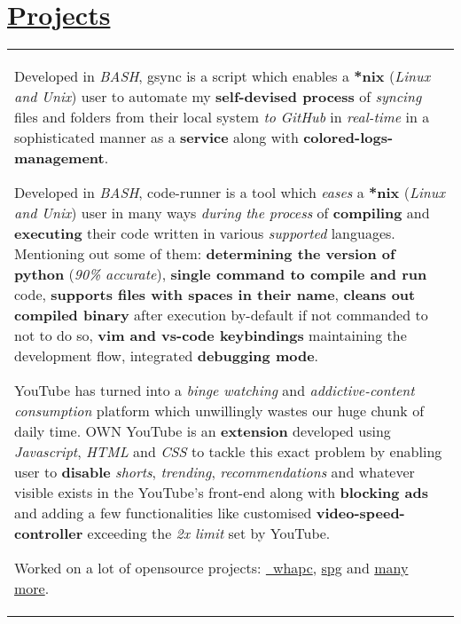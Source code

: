 \documentclass[a4paper,10pt]{extarticle} %
\begin{document}
\section{\textcolor{primary}{\href{https://www.github.com/proffapt}{Projects}}}
 \vspace{-0.5cm}
\begin{tabular}{p{19.7cm}}
\begin{description}[style=nextline, font=$\bullet$\hspace{2mm}\normalsize]
 
 \item[{\href{https://github.com/proffapt/gsyc}{GSYNC}}] 
 Developed in \textit{BASH}, gsync is a script which enables a \textbf{*nix} (\textit{Linux and Unix}) user to automate my \textbf{self-devised process} of \textit{syncing} files and folders from their local system \textit{to GitHub} in \textit{real-time} in a sophisticated manner as a \textbf{service} along with \textbf{colored-logs-management}.
 
 \item[{\href{https://github.com/proffapt/code-runner}{Code\_Runner}}] 
Developed in \textit{BASH}, code-runner is a tool which \textit{eases} a \textbf{*nix} (\textit{Linux and Unix}) user in many ways \textit{during the process} of \textbf{compiling} and \textbf{executing} their code written in various \textit{supported} languages. Mentioning out some of them: \textbf{determining the version of python} (\textit{90\% accurate}), \textbf{single command to compile and run} code, \textbf{supports files with spaces in their name}, \textbf{cleans out compiled binary} after execution by-default if not commanded to not to do so, \textbf{vim and vs-code keybindings} maintaining the development flow, integrated \textbf{debugging mode}.
 
 \item[{\href{https://github.com/proffapt/own-youtube}{OWN YouTube}}] 
 YouTube has turned into a \textit{binge watching} and \textit{addictive-content consumption} platform which unwillingly wastes our huge chunk of daily time. OWN YouTube is an \textbf{extension} developed using \textit{Javascript}, \textit{HTML} and \textit{CSS} to tackle this exact problem by enabling user to \textbf{disable} \textit{shorts}, \textit{trending}, \textit{recommendations} and whatever visible exists in the YouTube's front-end along with \textbf{blocking ads} and adding a few functionalities like customised \textbf{video-speed-controller} exceeding the \textit{2x limit} set by YouTube.
 
  \item[Github OpenSource Projects] Worked on a lot of opensource projects: \href{https://github.com/proffapt/whapc}{\ whapc}, 
  \href{https://github.com/proffapt/spg}{spg} and \href{https://github.com/proffapt?tab=repositories}{many more}.
\end{description}
\end{tabular}
\end{document}
